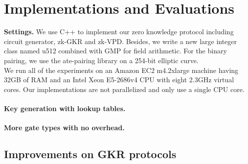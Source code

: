 
\section{Implementations and Evaluations}\label{sec:eval}

\textbf{Settings.} We use C++ to implement our zero knowledge protocol including circuit generator, zk-GKR and zk-VPD. Besides, we write a new large integer class named u512 combined with GMP\cite{GNU} for field arithmetic. For the binary pairing, we use the ate-pairing\cite{ate-pairing} library on a 254-bit elliptic curve.\\
We run all of the experiments on an Amazon EC2 m4.2xlarge machine having 32GB of RAM and an Intel Xeon E5-2686v4 CPU with eight 2.3GHz virtual cores. Our implementations are not parallelized and only use a single CPU core.\\

\paragraph{Key generation with lookup tables.}

\paragraph{More gate types with no overhead.}

\subsection{Improvements on GKR protocols}\label{subsec:expGKR}
